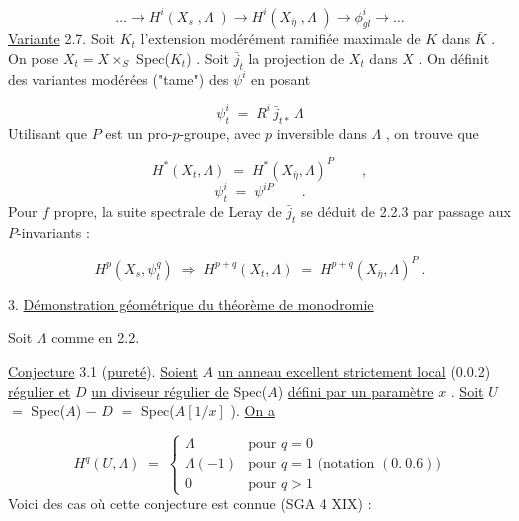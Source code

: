 \begin{equation*}\tag{2.6.2}
\dots \longrightarrow H^i(X_s\;,\Lambda\;) \longrightarrow H^i(X_{\bar{\eta}}\;,\Lambda\;) \longrightarrow \phi^i_{gl} \longrightarrow \dots
\end{equation*}
\underline{Variante} 2.7.  Soit  $K_t$  l'extension modérément ramifiée maximale de  $K$  dans  $\bar{K}$ . On pose  $X_t = X \times_S$ Spec($K_t$) . Soit  $\bar{j}_t$  la projection de  $X_t$  dans  $X$ . On définit des variantes modérées  ("tame")  des  $\psi^i$  en posant



\begin{equation*}
\psi^{i}_{t} \;=\; R^{i}\,\bar{j}_{t*}\,\Lambda
\end{equation*}
Utilisant que  $P$  est un pro-$p$-groupe, avec  $p$  inversible dans  $\Lambda$ , on trouve que

\begin{equation}\tag{2.7.1}
H^{*}(X_{t},\Lambda) \;=\; H^{*}(X_{\bar{\eta}},\Lambda)^{P} \qquad ,
\end{equation}
\begin{equation}\tag{2.7.2}
\psi^{i}_{t} \;=\; \psi^{iP} \qquad .
\end{equation}
Pour  $f$  propre, la suite spectrale de Leray de  $\bar{j}_{t}$  se déduit de 2.2.3 par passage aux  $P$-invariants :

\begin{equation}\tag{2.7.3}
H^{p}(X_{s},\psi^{q}_{t}) \;\Longrightarrow\; H^{p+q}(X_{t},\Lambda) \;=\; H^{p+q}(X_{\bar{\eta}},\Lambda)^{P}\ .
\end{equation}

3. \underline{Démonstration géométrique du théorème de monodromie}

Soit  $\Lambda$  comme en 2.2.

\underline{Conjecture} 3.1 (\underline{pureté}). \underline{Soient} $A$ \underline{un anneau excellent strictement local} (0.0.2) \underline{régulier et} $D$ \underline{un diviseur régulier de} Spec($A$) \underline{défini par un paramètre} $x$ . \underline{Soit} $U$ $=$ Spec($A$) $-$ $D$ $=$ Spec($A\left[1/x\right]$ ). \underline{On a}

\begin{equation}\tag{3.1.1}
H^{q}(U,\Lambda) \;=\; \left\{\begin{array}{ll} \Lambda & \text{pour } q = 0 \\[4pt] \Lambda(-1) & \text{pour } q = 1 \text{ (notation } (0.\ 0.6)) \\[4pt] 0 & \text{pour } q > 1 \end{array}\right.
\end{equation}
Voici des cas où cette conjecture est connue (SGA 4 XIX) :

